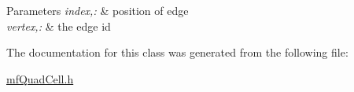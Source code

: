 \begin{DoxyParams}{Parameters}
{\em index,:} & position of edge \\
\hline
{\em vertex,:} & the edge id \\
\hline
\end{DoxyParams}


The documentation for this class was generated from the following file:\begin{DoxyCompactItemize}
\item 
\hyperlink{mfQuadCell_8h}{mfQuadCell.h}\end{DoxyCompactItemize}
